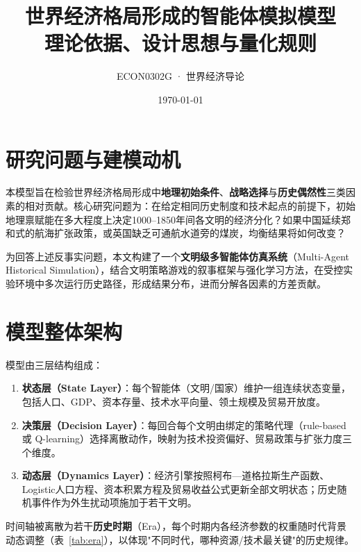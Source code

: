 \documentclass[12pt, a4paper]{article}
\title{\textbf{世界经济格局形成的智能体模拟模型}\\
       \large 理论依据、设计思想与量化规则}
\author{ECON0302G · 世界经济导论}
\date{\today}
\begin{document}
\maketitle
\tableofcontents
\newpage

\section{研究问题与建模动机}

本模型旨在检验世界经济格局形成中\textbf{地理初始条件}、\textbf{战略选择}与\textbf{历史偶然性}三类因素的相对贡献。核心研究问题为：在给定相同历史制度和技术起点的前提下，初始地理禀赋能在多大程度上决定1000--1850年间各文明的经济分化？如果中国延续郑和式的航海扩张政策，或英国缺乏可通航水道旁的煤炭，均衡结果将如何改变？

为回答上述反事实问题，本文构建了一个\textbf{文明级多智能体仿真系统}（Multi-Agent Historical Simulation），结合文明策略游戏的叙事框架与强化学习方法，在受控实验环境中多次运行历史路径，形成结果分布，进而分解各因素的方差贡献。

\section{模型整体架构}

模型由三层结构组成：

\begin{enumerate}[label=\textbf{\arabic*.}]
    \item \textbf{状态层（State Layer）}：每个智能体（文明/国家）维护一组连续状态变量，包括人口、GDP、资本存量、技术水平向量、领土规模及贸易开放度。
    \item \textbf{决策层（Decision Layer）}：每回合每个文明由绑定的策略代理（rule-based 或 Q-learning）选择离散动作，映射为技术投资偏好、贸易政策与扩张力度三个维度。
    \item \textbf{动态层（Dynamics Layer）}：经济引擎按照柯布—道格拉斯生产函数、Logistic人口方程、资本积累方程及贸易收益公式更新全部文明状态；历史随机事件作为外生扰动项施加于若干文明。
\end{enumerate}

时间轴被离散为若干\textbf{历史时期}（Era），每个时期内各经济参数的权重随时代背景动态调整（表~\ref{tab:era}），以体现"不同时代，哪种资源/技术最关键"的历史规律。
\end{document}
